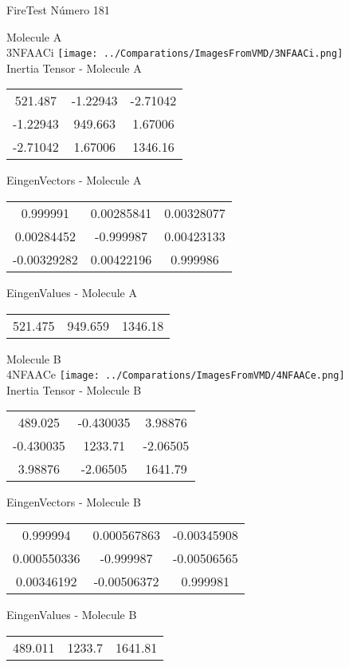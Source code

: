 \vtab[-2cm]
\begin{center}
{\large FireTest \tab Número 181}
\end{center}
\begin{multicols}{2}
\begin{center}

Molecule A \\ 
3NFAACi
\texttt{[image: ../Comparations/ImagesFromVMD/3NFAACi.png]}
\\
Inertia Tensor - Molecule A \\
\vtab

\begin{tabular}{|c c c|}
521.487	 & 	-1.22943	 & 	-2.71042	 \\
-1.22943	 & 	949.663	 & 	1.67006	 \\
-2.71042	 & 	1.67006	 & 	1346.16
\end{tabular}

\vtab
 EingenVectors - Molecule A     \\
\vtab
\begin{tabular}{|c c c|}
0.999991	 & 	0.00285841	 & 	0.00328077	 \\
0.00284452	 & 	-0.999987	 & 	0.00423133	 \\
-0.00329282	 & 	0.00422196	 & 	0.999986
\end{tabular}

\vtab
 EingenValues - Molecule A     \\
\vtab
\begin{tabular}{|c c c|}
521.475	 & 	949.659	 & 	1346.18	 \\
\end{tabular}
\columnbreak

Molecule B \\ 
4NFAACe
\texttt{[image: ../Comparations/ImagesFromVMD/4NFAACe.png]}
\\
Inertia Tensor - Molecule B \\
\vtab

\begin{tabular}{|c c c|}
489.025	 & 	-0.430035	 & 	3.98876	 \\
-0.430035	 & 	1233.71	 & 	-2.06505	 \\
3.98876	 & 	-2.06505	 & 	1641.79
\end{tabular}

\vtab
 EingenVectors - Molecule B     \\
\vtab
\begin{tabular}{|c c c|}
0.999994	 & 	0.000567863	 & 	-0.00345908	 \\
0.000550336	 & 	-0.999987	 & 	-0.00506565	 \\
0.00346192	 & 	-0.00506372	 & 	0.999981
\end{tabular}

\vtab
 EingenValues - Molecule B     \\
\vtab
\begin{tabular}{|c c c|}
489.011	 & 	1233.7	 & 	1641.81	 \\
\end{tabular}

\end{center}
\end{multicols}
